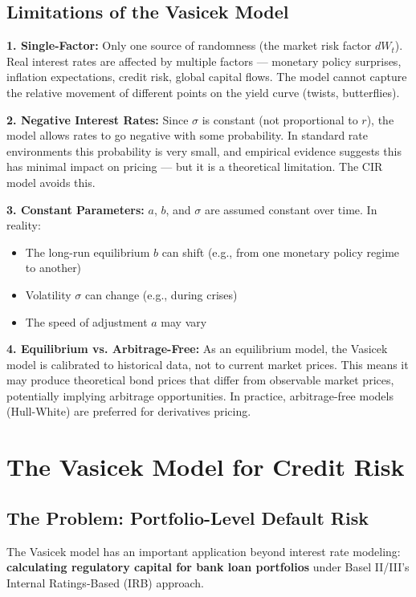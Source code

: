 \documentclass[12pt,openany]{book}
\theoremstyle{definition}
\theoremstyle{remark}
\begin{document}
\subsection{Limitations of the Vasicek Model}
\textbf{1. Single-Factor:} Only one source of randomness (the market risk factor $dW_t$). Real interest rates are affected by multiple factors --- monetary policy surprises, inflation expectations, credit risk, global capital flows. The model cannot capture the relative movement of different points on the yield curve (twists, butterflies).

\textbf{2. Negative Interest Rates:} Since $\sigma$ is constant (not proportional to $r$), the model allows rates to go negative with some probability. In standard rate environments this probability is very small, and empirical evidence suggests this has minimal impact on pricing --- but it is a theoretical limitation. The CIR model avoids this.

\textbf{3. Constant Parameters:} $a$, $b$, and $\sigma$ are assumed constant over time. In reality:

\begin{itemize}
\item The long-run equilibrium $b$ can shift (e.g., from one monetary policy regime to another)


\item Volatility $\sigma$ can change (e.g., during crises)


\item The speed of adjustment $a$ may vary


\end{itemize}
\textbf{4. Equilibrium vs. Arbitrage-Free:} As an equilibrium model, the Vasicek model is calibrated to historical data, not to current market prices. This means it may produce theoretical bond prices that differ from observable market prices, potentially implying arbitrage opportunities. In practice, arbitrage-free models (Hull-White) are preferred for derivatives pricing.

\medskip
\section{The Vasicek Model for Credit Risk}
\subsection{The Problem: Portfolio-Level Default Risk}
The Vasicek model has an important application beyond interest rate modeling: \textbf{calculating regulatory capital for bank loan portfolios} under Basel II/III's Internal Ratings-Based (IRB) approach.
\end{document}

